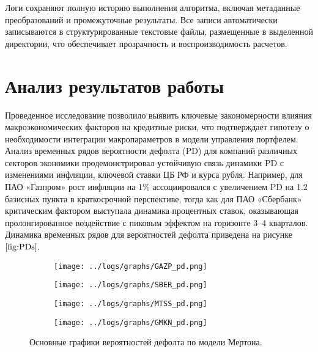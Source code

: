 \documentclass[]{article}
\begin{document}
	Логи сохраняют полную историю выполнения алгоритма, включая метаданные преобразований и промежуточные результаты. Все записи автоматически записываются в структурированные текстовые файлы, размещенные в выделенной директории, что обеспечивает прозрачность и воспроизводимость расчетов.
	
	
	\section{Анализ результатов работы}
	
	Проведенное исследование позволило выявить ключевые закономерности влияния макроэкономических факторов на кредитные риски, что подтверждает гипотезу о необходимости интеграции макропараметров в модели управления портфелем. Анализ временных рядов вероятности дефолта (PD) для компаний различных секторов экономики продемонстрировал устойчивую связь динамики PD с изменениями инфляции, ключевой ставки ЦБ РФ и курса рубля. Например, для ПАО «Газпром» рост инфляции на 1\% ассоциировался с увеличением PD на 1.2 базисных пункта в краткосрочной перспективе, тогда как для ПАО «Сбербанк» критическим фактором выступала динамика процентных ставок, оказывающая пролонгированное воздействие с пиковым эффектом на горизонте 3–4 кварталов. Динамика временных рядов для вероятностей дефолта приведена на рисунке $\ref{fig:PDs}$.
	
	
			\begin{figure}[ht]
		\centering
		\begin{subfigure}[b]{0.48\textwidth} %
			\texttt{[image: ../logs/graphs/GAZP\_pd.png]}
			\label{fig:img1}
		\end{subfigure}
		\hfill %
		\begin{subfigure}[b]{0.48\textwidth}
			\texttt{[image: ../logs/graphs/SBER\_pd.png]}
			\label{fig:img2}
		\end{subfigure}
		
		
		\begin{subfigure}[b]{0.48\textwidth}
			\texttt{[image: ../logs/graphs/MTSS\_pd.png]}
			\label{fig:img3}
		\end{subfigure}
		\hfill
		\begin{subfigure}[b]{0.48\textwidth}
			\texttt{[image: ../logs/graphs/GMKN\_pd.png]}
			\label{fig:img4}
		\end{subfigure}
		\caption{Основные графики вероятностей дефолта по модели Мертона.}
		\label{fig:PDs}
	\end{figure}
	
\end{document}
